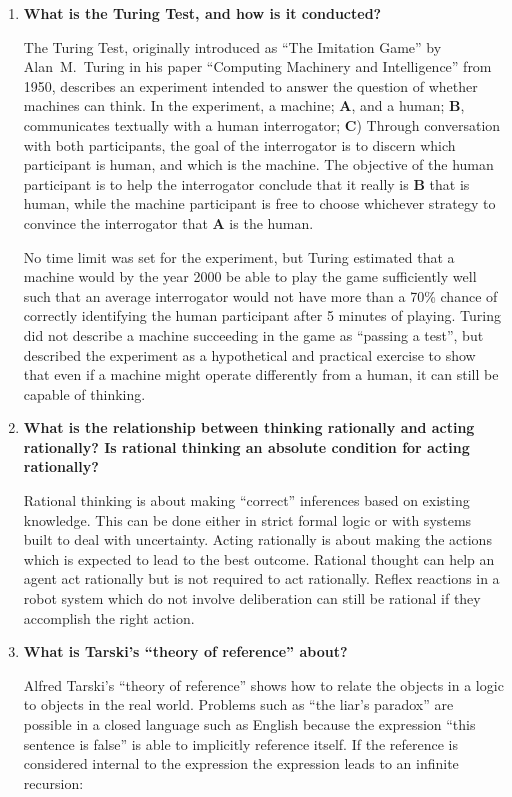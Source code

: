 \begin{enumerate}
\item \textbf{What is the Turing Test, and how is it conducted?}

The Turing Test, originally introduced as ``The Imitation Game'' by Alan~M.~Turing in his paper ``Computing Machinery and Intelligence'' from 1950, describes an experiment intended to answer the question of whether machines can think. In the experiment, a machine; \textbf{A}, and a human; \textbf{B}, communicates textually with a human interrogator; \textbf{C}) Through conversation with both participants, the goal of the interrogator is to discern which participant is human, and which is the machine. The objective of the human participant is to help the interrogator conclude that it really is \textbf{B} that is human, while the machine participant is free to choose whichever strategy to convince the interrogator that \textbf{A} is the human.

No time limit was set for the experiment, but Turing estimated that a machine would by the year 2000 be able to play the game sufficiently well such that an average interrogator would not have more than a 70\% chance of correctly identifying the human participant after 5 minutes of playing. Turing did not describe a machine succeeding in the game as ``passing a test'', but described the experiment as a hypothetical and practical exercise to show that even if a machine might operate differently from a human, it can still be capable of thinking.

\item \textbf{What is the relationship between thinking rationally and acting rationally? Is rational thinking an absolute condition for acting rationally?}

Rational thinking is about making ``correct'' inferences based on existing knowledge. This can be done either in strict formal logic or with systems built to deal with uncertainty. Acting rationally is about making the actions which is expected to lead to the best outcome. Rational thought can help an agent act rationally but is not required to act rationally. Reflex reactions in a robot system which do not involve deliberation can still be rational if they accomplish the right action.

\item \textbf{What is Tarski's ``theory of reference'' about?}

Alfred Tarski's ``theory of reference'' shows how to relate the objects in a logic to objects in the real world. Problems such as ``the liar's paradox'' are possible in a closed language such as English because the expression ``this sentence is false'' is able to implicitly reference itself. If the reference is considered internal to the expression the expression leads to an infinite recursion:


\end{enumerate}
